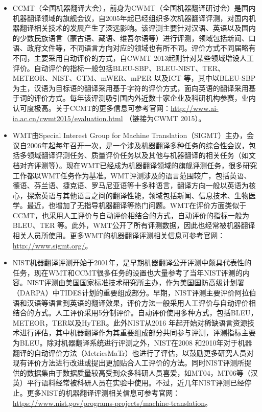 \begin{itemize}
\vspace{0.5em}
\item CCMT（全国机器翻译大会），前身为CWMT（全国机器翻译研讨会）是国内机器翻译领域的旗舰会议，自2005年起已经组织多次机器翻译评测，对国内机器翻译相关技术的发展产生了深远影响。该评测主要针对汉语、英语以及国内的少数民族语言（蒙古语、藏语、维吾尔语等）进行评测，领域包括新闻、口语、政府文件等，不同语言方向对应的领域也有所不同。评价方式不同届略有不同，主要采用自动评价的方式，自CWMT 2013起则针对某些领域增设人工评价。自动评价的指标一般包括BLEU-SBP、BLEU-NIST、TER、METEOR、NIST、GTM、mWER、mPER 以及ICT 等，其中以BLEU-SBP 为主，汉语为目标语的翻译采用基于字符的评价方式，面向英语的翻译采用基于词的评价方式。每年该评测吸引国内外近数十家企业及科研机构参赛，业内认可度极高。关于CCMT的更多信息可参考官网：\url{http://www.ai-ia.ac.cn/cwmt2015/evaluation.html} （链接为CWMT 2015）。
\vspace{0.5em}
\item WMT由Special Interest Group for Machine Translation（SIGMT）主办，会议自2006年起每年召开一次，是一个涉及机器翻译多种任务的综合性会议，包括多领域翻译评测任务、质量评价任务以及其他与机器翻译的相关任务（如文档对齐评测等）。现在WMT已经成为机器翻译领域的旗舰评测任务，很多研究工作都以WMT任务作为基准。WMT评测涉及的语言范围较广，包括英语、德语、芬兰语、捷克语、罗马尼亚语等十多种语言，翻译方向一般以英语为核心，探索英语与其他语言之间的翻译性能，领域包括新闻、信息技术、生物医学。最近，也增加了无指导机器翻译等热门问题。WMT在评价方面类似于CCMT，也采用人工评价与自动评价相结合的方式，自动评价的指标一般为BLEU、TER 等。此外，WMT公开了所有评测数据，因此也经常被机器翻译相关人员所使用。更多WMT的机器翻译评测相关信息可参考官网：\url{http://www.sigmt.org/}。
\vspace{0.5em}
\item NIST机器翻译评测开始于2001年，是早期机器翻译公开评测中颇具代表性的任务，现在WMT和CCMT很多任务的设置也大量参考了当年NIST评测的内容。NIST评测由美国国家标准技术研究所主办，作为美国国防高级计划署（DARPA）中TIDES计划的重要组成部分。早期，NIST评测主要评价阿拉伯语和汉语等语言到英语的翻译效果，评价方法一般采用人工评价与自动评价相结合的方式。人工评价采用5分制评价。自动评价使用多种方式，包括BLEU，METEOR，TER以及HyTER。此外NIST从2016 年起开始对稀缺语言资源技术进行评估，其中机器翻译作为其重要组成部分共同参与评测，评测指标主要为BLEU。除对机器翻译系统进行评测之外，NIST在2008 和2010年对于机器翻译的自动评价方法（MetricsMaTr）也进行了评估，以鼓励更多研究人员对现有评价方法进行改进或提出更加贴合人工评价的方法。同时NIST评测所提供的数据集由于数据质量较高受到众多科研人员喜爱，如MT04，MT06等（汉英）平行语料经常被科研人员在实验中使用。不过，近几年NIST评测已经停止。更多NIST的机器翻译评测相关信息可参考官网：\url{https://www.nist.gov/programs-projects/machine-translation}。

\end{itemize}
